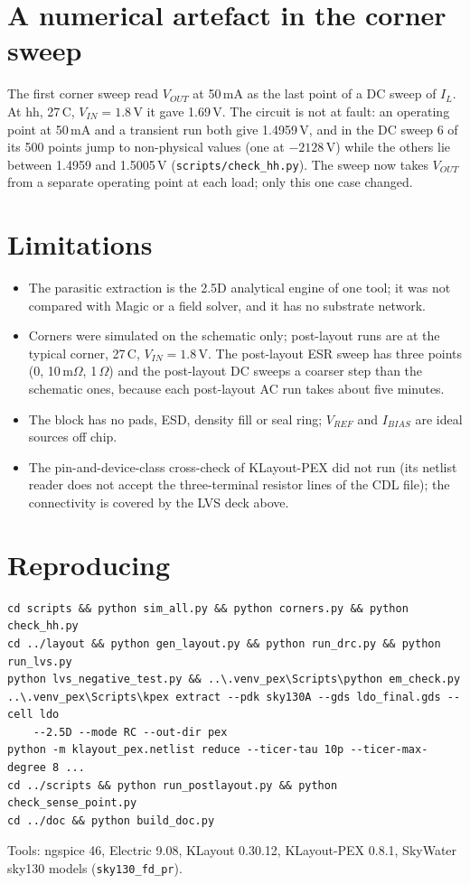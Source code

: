 \documentclass[10pt,a4paper]{article}
\newcommand{\VOUT}{V_{OUT}}
\newcommand{\VIN}{V_{IN}}
\newcommand{\IL}{I_{L}}
\begin{document}
\section{A numerical artefact in the corner sweep}
The first corner sweep read $\VOUT$ at 50\,mA as the last point of a DC sweep of $\IL$. At hh, 27\,\textdegree C, $\VIN = 1.8$\,V it gave 1.69\,V. The circuit is not at fault: an operating point at 50\,mA and a transient run both give 1.4959\,V, and in the DC sweep 6 of its 500 points jump to non-physical values (one at $-2128$\,V) while the others lie between 1.4959 and 1.5005\,V (\texttt{scripts/check\_hh.py}). The sweep now takes $\VOUT$ from a separate operating point at each load; only this one case changed.

\section{Limitations}
\begin{itemize}
\item The parasitic extraction is the 2.5D analytical engine of one tool; it was not compared with Magic or a field solver, and it has no substrate network.
\item Corners were simulated on the schematic only; post-layout runs are at the typical corner, 27\,\textdegree C, $\VIN = 1.8$\,V. The post-layout ESR sweep has three points (0, 10\,m$\Omega$, 1\,$\Omega$) and the post-layout DC sweeps a coarser step than the schematic ones, because each post-layout AC run takes about five minutes.
\item The block has no pads, ESD, density fill or seal ring; $V_{REF}$ and $I_{BIAS}$ are ideal sources off chip.
\item The pin-and-device-class cross-check of KLayout-PEX did not run (its netlist reader does not accept the three-terminal resistor lines of the CDL file); the connectivity is covered by the LVS deck above.

\end{itemize}

\section{Reproducing}
\begin{verbatim}
cd scripts && python sim_all.py && python corners.py && python check_hh.py
cd ../layout && python gen_layout.py && python run_drc.py && python run_lvs.py
python lvs_negative_test.py && ..\.venv_pex\Scripts\python em_check.py
..\.venv_pex\Scripts\kpex extract --pdk sky130A --gds ldo_final.gds --cell ldo
    --2.5D --mode RC --out-dir pex
python -m klayout_pex.netlist reduce --ticer-tau 10p --ticer-max-degree 8 ...
cd ../scripts && python run_postlayout.py && python check_sense_point.py
cd ../doc && python build_doc.py
\end{verbatim}
\noindent Tools: ngspice 46, Electric 9.08, KLayout 0.30.12, KLayout-PEX 0.8.1, SkyWater sky130 models (\texttt{sky130\_fd\_pr}).
\end{document}
